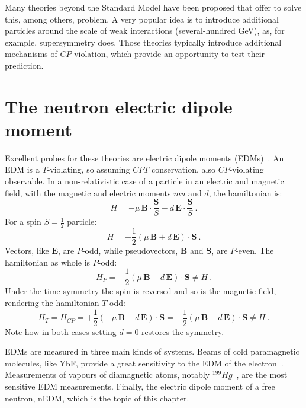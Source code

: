Many theories beyond the Standard Model have been proposed that offer to solve this, among others, problem. A very popular idea is to introduce additional particles around the scale of weak interactions (several-hundred GeV), as, for example, supersymmetry does. Those theories typically introduce additional mechanisms of $CP$-violation, which provide an opportunity to test their prediction.



\section{The neutron electric dipole moment}

Excellent probes for these theories are electric dipole moments (EDMs)~\cite{Pospelov2005}. An EDM is a $T$-violating, so assuming $CPT$ conservation, also $CP$-violating observable. In a non-relativistic case of a particle in an electric and magnetic field, with the magnetic and electric moments $mu$ and $d$, the hamiltonian is:
\begin{equation}
  H = - \mu \, \bm{B} \cdot \frac{\bm{S}}{S} - d \, \bm{E} \cdot \frac{\bm{S}}{S} \ .
\end{equation}
For a spin $S = \frac{1}{2}$ particle:
\begin{equation}
  H = - \frac{1}{2} \left( \mu \, \bm{B} + d \, \bm{E} \right ) \cdot \bm{S} \ .
\end{equation}
Vectors, like $\bm{E}$, are $P$-odd, while pseudovectors, $\bm{B}$ and $\bm{S}$, are $P$-even. The hamiltonian as whole is $P$-odd:
\begin{equation}
  H_P = - \frac{1}{2} \left( \mu \, \bm{B} - d \, \bm{E} \right ) \cdot \bm{S} \neq H \ .
\end{equation}
Under the time symmetry the spin is reversed and so is the magnetic field, rendering the hamiltonian $T$-odd:
\begin{equation}
  H_T = H_{CP} = + \frac{1}{2} \left( - \mu \, \bm{B} + d \, \bm{E} \right ) \cdot \bm{S} = - \frac{1}{2} \left( \mu \, \bm{B} - d \, \bm{E} \right ) \cdot \bm{S} \neq H \ .
\end{equation}
Note how in both cases setting $d = 0$ restores the symmetry.

EDMs are measured in three main kinds of systems. Beams of cold paramagnetic molecules, like YbF, provide a great sensitivity to the EDM of the electron~\cite{Hudson2011}. Measurements of vapours of diamagnetic atoms, notably $^{199}Hg$~\cite{PhysRevLett.116.161601}, are the most sensitive EDM measurements. Finally, the electric dipole moment of a free neutron, nEDM, which is the topic of this chapter.

